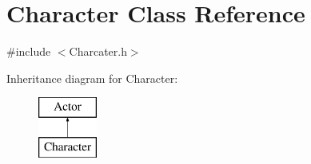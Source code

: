 \hypertarget{class_character}{}\section{Character Class Reference}
\label{class_character}


{\ttfamily \#include $<$Charcater.\+h$>$}

Inheritance diagram for Character\+:\begin{figure}[H]
\begin{center}
\leavevmode
\includegraphics[height=2.000000cm]{class_character}
\end{center}
\end{figure}
